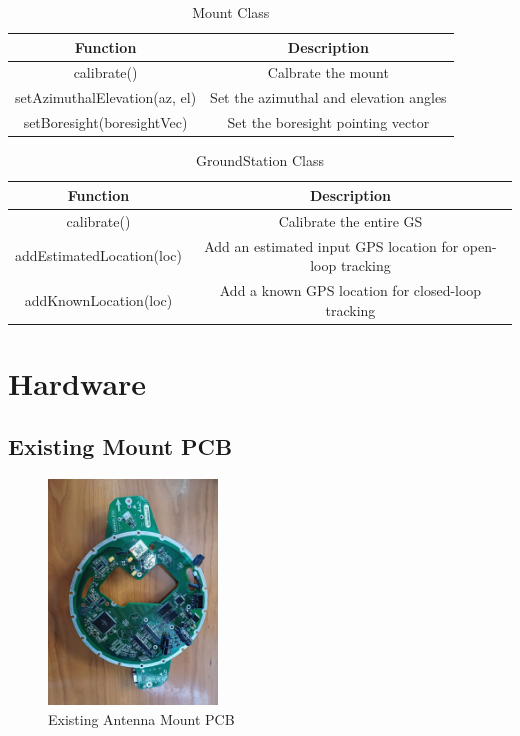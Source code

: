 \begin{table}[!htb]
  \centering
  \caption{Mount Class}
  \renewcommand{\arraystretch}{1.2}
  \begin{tabular}{ |c|c| }
  \hline
  \textbf{Function}        & \textbf{Description}    \\
  \hline
    calibrate()                         & Calbrate the mount \\
    setAzimuthalElevation(az, el)       & Set the azimuthal and elevation angles \\
    setBoresight(boresightVec)          & Set the boresight pointing vector \\
  \hline
  \end{tabular}
  \label{tab:mountUML}
\end{table}

\begin{table}[!htb]
  \centering
  \caption{GroundStation Class}
  \renewcommand{\arraystretch}{1.2}
  \begin{tabular}{ |c|c| }
  \hline
  \textbf{Function}             & \textbf{Description}    \\
  \hline
    calibrate()                 & Calibrate the entire GS \\
    addEstimatedLocation(loc)      & Add an estimated input GPS location for open-loop tracking \\
    addKnownLocation(loc)          & Add a known GPS location for closed-loop tracking \\
  \hline
  \end{tabular}
  \label{tab:groundStationUML}
\end{table}


\chapter{Hardware}
\section{Existing Mount PCB}\label{sec:appendix_gs_pcb_existing}
\begin{figure}[!htb]
  \centering
  \includegraphics[width=0.4\textwidth, angle=90, origin=c]{gs_existing}
  \caption{Existing Antenna Mount PCB}
  \label{fig:gs_existing}
\end{figure}
\newpage
